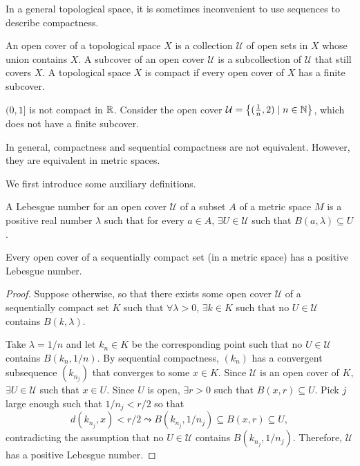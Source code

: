 In a general topological space, it is sometimes inconvenient to use sequences to describe compactness. 

\begin{df}
    An open cover of a topological space $X$ is a collection $\mathcal U$ of open sets in $X$ whose union contains $X$. A subcover of an open cover $\mathcal U$ is a subcollection of $\mathcal U$ that still covers $X$. A topological space $X$ is compact if every open cover of $X$ has a finite subcover.
\end{df}

\begin{ex}
    $(0, 1]$ is not compact in ${\mathbb R}$. Consider the open cover $\mathcal U = {\left\{{(\frac1n, 2) \mid n\in {\mathbb N}}\right\}}$, which does not have a finite subcover.
\end{ex}

In general, compactness and sequential compactness are not equivalent. However, they are equivalent in metric spaces.

We first introduce some auxiliary definitions.

\begin{df}
    A Lebesgue number for an open cover $\mathcal U$ of a subset $A$ of a metric space $M$ is a positive real number $\lambda$ such that for every $a\in A$, $\exists U \in \mathcal U$ such that $B(a, \lambda) \subseteq U$.
\end{df}

\begin{lm}
    Every open cover of a sequentially compact set (in a metric space) has a positive Lebesgue number.
    \begin{proof}
        Suppose otherwise, so that there exists some open cover $\mathcal U$ of a sequentially compact set $K$ such that $\forall \lambda > 0$, $\exists k \in K$ such that no $U\in \mathcal U$ contains $B(k, \lambda)$. 

        Take $\lambda = 1/n$ and let $k_n \in K$ be the corresponding point such that no $U\in \mathcal U$ contains $B(k_n, 1/n)$. By sequential compactness, $(k_n)$ has a convergent subsequence $(k_{n_j})$ that converges to some $x\in K$. Since $\mathcal U$ is an open cover of $K$, $\exists U \in \mathcal U$ such that $x\in U$. Since $U$ is open, $\exists r > 0$ such that $B(x, r) \subseteq U$. Pick $j$ large enough such that $1/n_j < r/2$ so that
        \[
        d(k_{n_j}, x) < r/2 \leadsto B(k_{n_j}, 1/n_j) \subseteq B(x, r) \subseteq U,
        \]
        contradicting the assumption that no $U\in \mathcal U$ contains $B(k_{n_j}, 1/n_j)$. Therefore, $\mathcal U$ has a positive Lebesgue number.
    \end{proof}
\end{lm}

